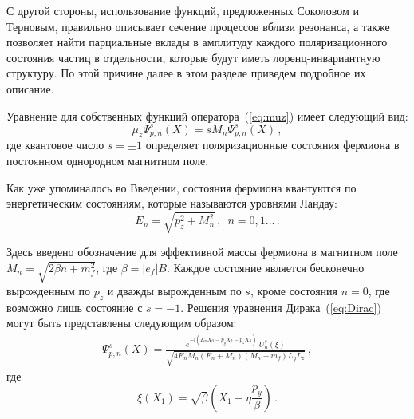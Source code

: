 С другой стороны, использование функций, предложенных Соколовом и Терновым, правильно описывает сечение процессов вблизи резонанса, а также позволяет найти парциальные вклады в амплитуду каждого поляризационного состояния частиц в отдельности, которые будут иметь лоренц-инвариантную структуру. По этой причине далее в этом разделе приведем подробное их описание. 

Уравнение для собственных функций оператора~(\ref{eq:muz}) имеет следующий вид:
\begin{equation}
	{\mu}_z \Psi^s_{p,n}(X)=s M_n \Psi^s_{p,n}(X)\, ,
\end{equation}
где квантовое число $s=\pm 1$ определяет поляризационные состояния фермиона в постоянном однородном магнитном поле.

Как уже упоминалось во Введении, состояния фермиона квантуются по энергетическим состояниям, которые называются уровнями Ландау:
\begin{equation}\label{eq:Energy_n}
	E_n = \sqrt{p_z^2+M_n^2}\, ,\,\,\, n=0,1\dots \, .
\end{equation}

Здесь введено обозначение для эффективной массы фермиона в магнитном поле $M_n=\sqrt{2 \beta n + m_f^2}$, где $\beta=|e_f|B$. Каждое состояние является бесконечно вырожденным по $p_z$ и дважды вырожденным по $s$, кроме состояния $n=0$, где возможно лишь состояние с $s=-1$. Решения уравнения Дирака~(\ref{eq:Dirac}) могут быть представлены следующим образом:
\begin{eqnarray}
\label{eq:psie}
\Psi^s_{p,n}(X) = \frac{e^{-\ii(E_{n} X_0 - p_y X_2 - p_z X_3)}\; U^s_{n} (\xi)}
{\sqrt{4E_{n}M_n (E_{n} + M_n)(M_n + m_f) L_y L_z}} \, ,  
\end{eqnarray}
где 
\begin{equation}
	\xi(X_1)=\sqrt{\beta}\left(X_1-\eta \frac{p_y}{\beta}\right)\, .
\end{equation}

